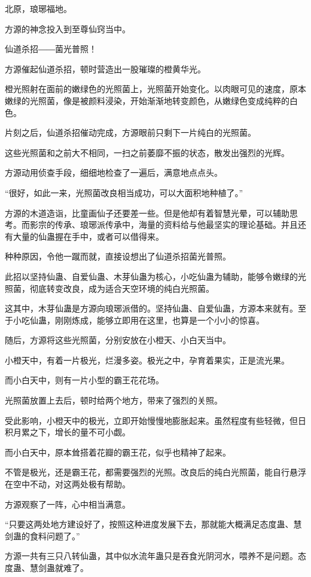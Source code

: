 \begin{this_body}
北原，琅琊福地。

方源的神念投入到至尊仙窍当中。

仙道杀招――菌光普照！

方源催起仙道杀招，顿时营造出一股璀璨的橙黄华光。

橙光照射在面前的嫩绿色的光照菌上，光照菌开始变化。以肉眼可见的速度，原本嫩绿的光照菌，像是被颜料浸染，开始渐渐地转变颜色，从嫩绿色变成纯粹的白色。

片刻之后，仙道杀招催动完成，方源眼前只剩下一片纯白的光照菌。

这些光照菌和之前大不相同，一扫之前萎靡不振的状态，散发出强烈的光辉。

方源动用侦查手段，细细地检查了一遍后，满意地点点头。

“很好，如此一来，光照菌改良相当成功，可以大面积地种植了。”

方源的木道造诣，比童画仙子还要差一些。但是他却有着智慧光晕，可以辅助思考。而影宗的传承、琅琊派传承中，海量的资料给与他最坚实的理论基础。并且还有大量的仙蛊握在手中，或者可以借得来。

种种原因，令他一蹴而就，直接设想出了仙道杀招菌光普照。

此招以坚持仙蛊、自爱仙蛊、木芽仙蛊为核心，小吃仙蛊为辅助，能够令嫩绿的光照菌，彻底转变改良，成为适合天空环境的纯白光照菌。

这其中，木芽仙蛊是方源向琅琊派借的。坚持仙蛊、自爱仙蛊，方源本来就有。至于小吃仙蛊，刚刚炼成，能够立即用在这里，也算是一个小小的惊喜。

随后，方源将这些光照菌，分别安放在小橙天、小白天当中。

小橙天中，有着一片极光，烂漫多姿。极光之中，孕育着果实，正是流光果。

而小白天中，则有一片小型的霸王花花场。

光照菌放置上去后，顿时给两个地方，带来了强烈的关照。

受此影响，小橙天中的极光，立即开始慢慢地膨胀起来。虽然程度有些轻微，但日积月累之下，增长的量不可小觑。

而小白天中，原本耸搭着花瓣的霸王花，似乎也精神了起来。

不管是极光，还是霸王花，都需要强烈的光照。改良后的纯白光照菌，能自行悬浮在空中不动，对这两处极有帮助。

方源观察了一阵，心中相当满意。

“只要这两处地方建设好了，按照这种进度发展下去，那就能大概满足态度蛊、慧剑蛊的食料问题了。”

方源一共有三只八转仙蛊，其中似水流年蛊只是吞食光阴河水，喂养不是问题。态度蛊、慧剑蛊就难了。


\end{this_body}
